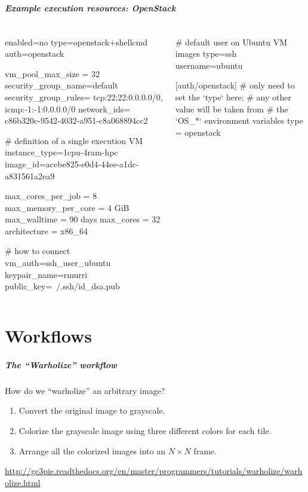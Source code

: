 \documentclass[english,serif,mathserif,usenames,dvipsnames]{beamer}
\begin{document}
\begin{frame}[fragile]
  \frametitle{Example execution resources: OpenStack}
  \begin{columns}[t]
    \begin{column}{0.5\textwidth}
\begin{stdout}
enabled=no
type=openstack+shellcmd
auth=openstack

vm_pool_max_size = 32
security_group_name=default
security_group_rules=
  tcp:22:22:0.0.0.0/0,
  icmp:-1:-1:0.0.0.0/0
network_ids=
  c86b320c-9542-4032-a951-c8a068894cc2

# definition of a single execution VM
instance_type=1cpu-4ram-hpc
image_id=acebe825-e0d4-44ee-a1dc-a831561a2ea9

max_cores_per_job = 8
max_memory_per_core = 4 GiB
max_walltime = 90 days
max_cores = 32
architecture = x86_64

# how to connect
vm_auth=ssh_user_ubuntu
keypair_name=rmurri
public_key=~/.ssh/id_dsa.pub
\end{stdout}
    \end{column}
    \begin{column}{0.5\textwidth}
      \begin{stdout}
# default user on Ubuntu VM images
type=ssh
username=ubuntu


[auth/openstack]
# only need to set the `type` here;
# any other value will be taken from
# the `OS\_*` environment variables
type = openstack
      \end{stdout}
    \end{column}
  \end{columns}
\end{frame}


\part{Workflows}

\begin{frame}[label=workflows]
  \frametitle{The ``Warholize'' workflow}
How do we ``warholize'' an arbitrary image?

\+
\begin{enumerate}
\item Convert the original image to grayscale.
\item Colorize the grayscale image using three different colors for each tile.
\item Arrange all the colorized images into an $N\times N$ frame.
\end{enumerate}

\+
\begin{references}
  \url{http://gc3pie.readthedocs.org/en/master/programmers/tutorials/warholize/warholize.html}
\end{references}
\end{frame}
\end{document}
